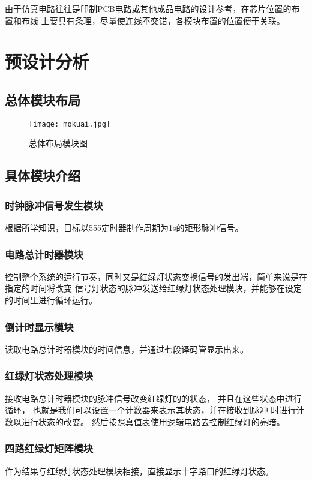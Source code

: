 \documentclass[AutoFakeBold]{LZUThesis}
\begin{document}
由于仿真电路往往是印制PCB电路或其他成品电路的设计参考，在芯片位置的布置和布线
上要具有条理，尽量使连线不交错，各模块布置的位置便于关联。
\chapter{预设计分析}

\section{总体模块布局}

\begin{figure}[htbp]
    \centering
    \texttt{[image: mokuai.jpg]}
    \caption{总体布局模块图}
\end{figure}

\section{具体模块介绍}
\subsection{时钟脉冲信号发生模块}
根据所学知识，目标以555定时器制作周期为1s的矩形脉冲信号。

\subsection{电路总计时器模块}
控制整个系统的运行节奏，同时又是红绿灯状态变换信号的发出端，简单来说是在指定的时间将改变
信号灯状态的脉冲发送给红绿灯状态处理模块，并能够在设定的时间里进行循环运行。

\subsection{倒计时显示模块}
读取电路总计时器模块的时间信息，并通过七段译码管显示出来。

\subsection{红绿灯状态处理模块}
接收电路总计时器模块的脉冲信号改变红绿灯的的状态，
并且在这些状态中进行循环，
也就是我们可以设置一个计数器来表示其状态，并在接收到脉冲
时进行计数以进行状态的改变。
然后按照真值表使用逻辑电路去控制红绿灯的亮暗。

\subsection{四路红绿灯矩阵模块}
作为结果与红绿灯状态处理模块相接，直接显示十字路口的红绿灯状态。
\end{document}
